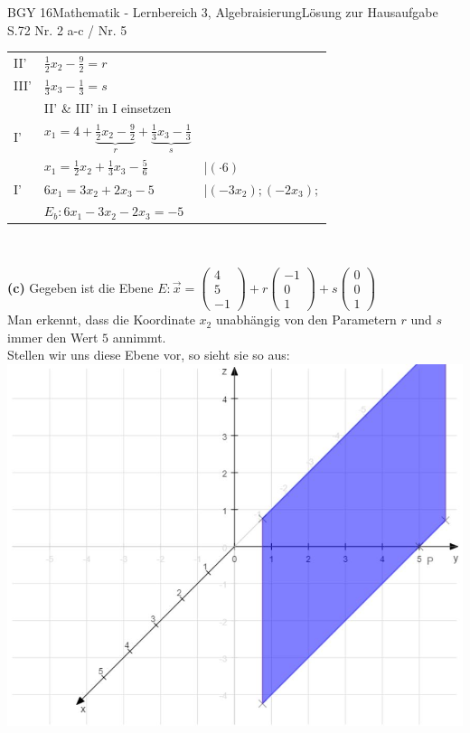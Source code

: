 \documentclass[oneside,openany,headings=optiontotoc,11pt,numbers=noenddot]{scrreprt}
\begin{document}
\begin{worksheet}{BGY 16}{Mathematik - Lernbereich 3, Algebraisierung}{Lösung zur Hausaufgabe S.72 Nr. 2 a-c / Nr. 5}
\begin{framed}
\begin{tabularx}{\textwidth}{lll}
				\hline
				II'& \(\frac{1}{2}x_2 - \frac{9}{2} = r\)\\
				III' & \(\frac{1}{3}x_3 -\frac{1}{3} = s\)\\
				& \multicolumn{2}{l}{II' \& III' in I einsetzen}\\
				I' & \(x_1 = 4 + \underbrace{\frac{1}{2}x_2 - \frac{9}{2}}_{r} + \underbrace{\frac{1}{3}x_3 -\frac{1}{3}}_{s}\)\\
				& \(x_1 = \frac{1}{2}x_2 + \frac{1}{3}x_3 - \frac{5}{6}\) & |\((\cdot 6)\)\\
				I' & \(6x_1 = 3x_2 + 2x_3 - 5\) & |\((-3x_2);(-2x_3);\)\\
				& \colorbox{green!10}{\(E_b: 6x_1 - 3x_2 - 2x_3 = -5\)}
			\end{tabularx}\\
			\par
			\textbf{(c)} Gegeben ist die Ebene \(E:\vec{x} = \left(\begin{array}{c}4\\5\\-1\end{array}\right) + r\left(\begin{array}{c}-1\\0\\1\end{array}\right) + s\left(\begin{array}{c}0\\0\\1\end{array}\right)\)\\
			Man erkennt, dass die Koordinate \(x_2\) unabhängig von den Parametern \(r\) und \(s\) immer den Wert \(5\) annimmt.\\
			Stellen wir uns diese Ebene vor, so sieht sie so aus:\\
			\includegraphics[scale=0.45]{Bilder/S72N2c.jpg}\\

\end{framed}
\end{worksheet}
\end{document}
